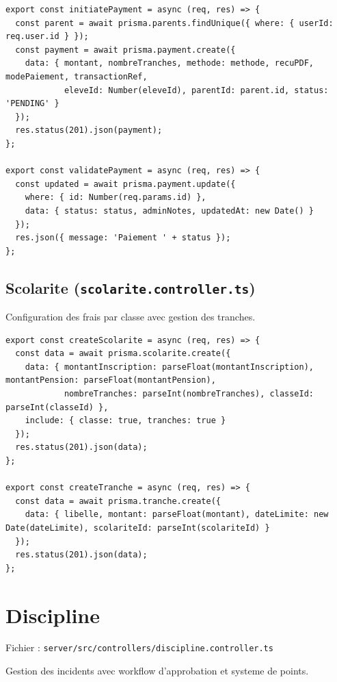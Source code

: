 \documentclass[12pt,a4paper]{article}
\begin{document}
\begin{lstlisting}[style=code]
export const initiatePayment = async (req, res) => {
  const parent = await prisma.parents.findUnique({ where: { userId: req.user.id } });
  const payment = await prisma.payment.create({
    data: { montant, nombreTranches, methode: methode, recuPDF, modePaiement, transactionRef,
            eleveId: Number(eleveId), parentId: parent.id, status: 'PENDING' }
  });
  res.status(201).json(payment);
};

export const validatePayment = async (req, res) => {
  const updated = await prisma.payment.update({
    where: { id: Number(req.params.id) },
    data: { status: status, adminNotes, updatedAt: new Date() }
  });
  res.json({ message: 'Paiement ' + status });
};
\end{lstlisting}

\subsection{Scolarite (\texttt{scolarite.controller.ts})}

Configuration des frais par classe avec gestion des tranches.

\begin{lstlisting}[style=code]
export const createScolarite = async (req, res) => {
  const data = await prisma.scolarite.create({
    data: { montantInscription: parseFloat(montantInscription), montantPension: parseFloat(montantPension),
            nombreTranches: parseInt(nombreTranches), classeId: parseInt(classeId) },
    include: { classe: true, tranches: true }
  });
  res.status(201).json(data);
};

export const createTranche = async (req, res) => {
  const data = await prisma.tranche.create({
    data: { libelle, montant: parseFloat(montant), dateLimite: new Date(dateLimite), scolariteId: parseInt(scolariteId) }
  });
  res.status(201).json(data);
};
\end{lstlisting}

\newpage

\section{Discipline}

Fichier : \texttt{server/src/controllers/discipline.controller.ts}

Gestion des incidents avec workflow d'approbation et systeme de points.
\end{document}
